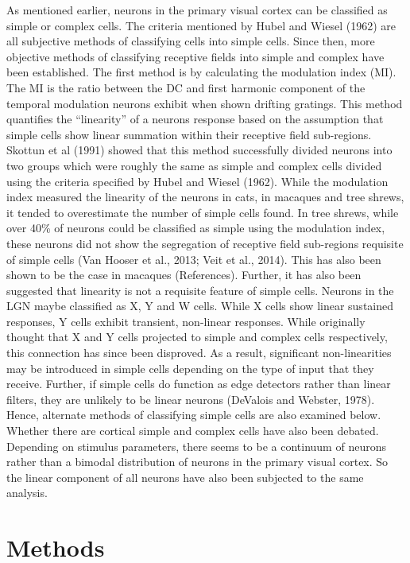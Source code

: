 	As mentioned earlier, neurons in the primary visual cortex can be classified as simple or complex cells. The criteria mentioned by Hubel and Wiesel (1962) are all subjective methods of classifying cells into simple cells. Since then, more objective methods of classifying receptive fields into simple and complex have been established. The first method is by calculating the modulation index (MI). The MI is the ratio between the DC and first harmonic component of the temporal modulation neurons exhibit when shown drifting gratings. This method quantifies the “linearity” of a neurons response based on the assumption that simple cells show linear summation within their receptive field sub-regions. Skottun et al (1991) showed that this method successfully divided neurons into two groups which were roughly the same as simple and complex cells divided using the criteria specified by Hubel and Wiesel (1962).
	While the modulation index measured the linearity of the neurons in cats, in macaques and tree shrews, it tended to overestimate the number of simple cells found. In tree shrews, while over 40\% of neurons could be classified as simple using the modulation index, these neurons did not show the segregation of receptive field sub-regions requisite of simple cells (Van Hooser et al., 2013; Veit et al., 2014). This has also been shown to be the case in macaques (References). 
	Further, it has also been suggested that linearity is not a requisite feature of simple cells. Neurons in the LGN maybe classified as X, Y and W cells. While X cells show linear sustained responses, Y cells exhibit transient, non-linear responses. While originally thought that X and Y cells projected to simple and complex cells respectively, this connection has since been disproved. As a result, significant non-linearities may be introduced in simple cells depending on the type of input that they receive. Further, if simple cells do function as edge detectors rather than linear filters, they are unlikely to be linear neurons (DeValois and Webster, 1978). Hence, alternate methods of classifying simple cells are also examined below. 
	Whether there are cortical simple and complex cells have also been debated. Depending on stimulus parameters, there seems to be a continuum of neurons rather than a bimodal distribution of neurons in the primary visual cortex. So the linear component of all neurons have also been subjected to the same analysis.
	
	\section{Methods}
		
